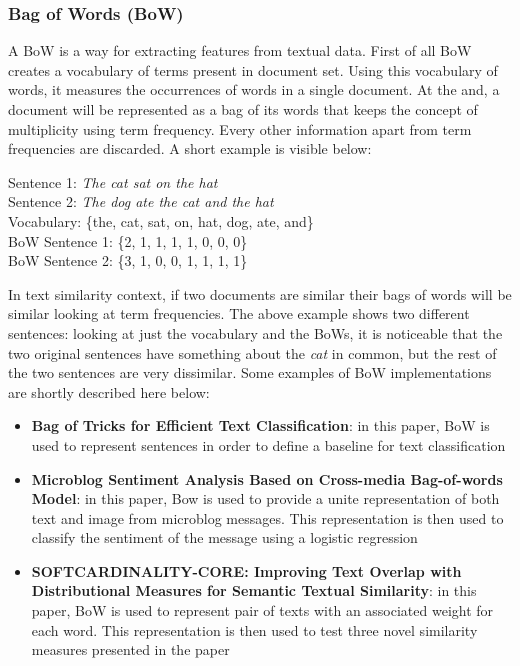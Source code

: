 \documentclass[\main/main.tex]{subfiles}
\begin{document}
\subsubsection{Bag of Words (BoW)}
A BoW is a way for extracting features from textual data. First of all BoW creates a vocabulary of terms present in document set. Using this vocabulary of words, it measures the occurrences of words in a single document. At the and, a document will be represented as a bag of its words that keeps the concept of multiplicity using term frequency. Every other information apart from term frequencies are discarded.
A short example is visible below:
\begin{center}
    Sentence 1: \emph{The cat sat on the hat}\\
    Sentence 2: \emph{The dog ate the cat and the hat}\\
    Vocabulary: \{the, cat, sat, on, hat, dog, ate, and\}\\
    BoW Sentence 1: \{2, 1, 1, 1, 1, 0, 0, 0\}\\
    BoW Sentence 2: \{3, 1, 0, 0, 1, 1, 1, 1\}
\end{center}
In text similarity context, if two documents are similar their bags of words will be similar looking at term frequencies. The above example shows two different sentences: looking at just the vocabulary and the BoWs, it is noticeable that the two original sentences have something about the \emph{cat} in common, but the rest of the two sentences are very dissimilar. Some examples of BoW implementations are shortly described here below:
\begin{itemize}
    \item \textbf{Bag of Tricks for Efficient Text Classification}: in this paper, BoW is used to represent sentences in order to define a baseline for text classification \cite{Joulin2017BagOT}
    \item \textbf{Microblog Sentiment Analysis Based on Cross-media Bag-of-words Model}: in this paper, Bow is used to provide a unite representation of both text and image from microblog messages. This representation is then used to classify the sentiment of the message using a logistic regression \cite{Wang2014MicroblogSA}
    \item \textbf{SOFTCARDINALITY-CORE: Improving Text Overlap with Distributional Measures for Semantic Textual Similarity}: in this paper, BoW is used to represent pair of texts with an associated weight for each word. This representation is then used to test three novel similarity measures presented in the paper \cite{Jimnez2013SOFTCARDINALITYCOREIT}
\end{itemize}
\end{document}
